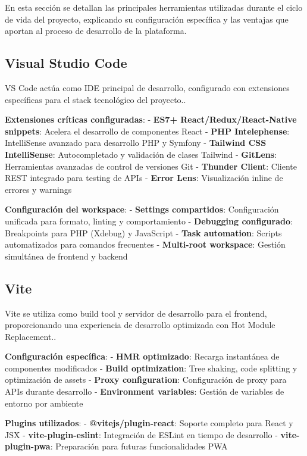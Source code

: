 \documentclass[12pt,a4paper,oneside]{report}
\begin{document}
En esta sección se detallan las principales herramientas utilizadas
durante el ciclo de vida del proyecto, explicando su configuración
específica y las ventajas que aportan al proceso de desarrollo de la
plataforma.

\subsection{Visual Studio Code}\label{visual-studio-code}

VS Code actúa como IDE principal de desarrollo, configurado con
extensiones específicas para el stack tecnológico del proyecto..

\textbf{Extensiones críticas configuradas}: - \textbf{ES7+
React/Redux/React-Native snippets}: Acelera el desarrollo de componentes
React - \textbf{PHP Intelephense}: IntelliSense avanzado para desarrollo
PHP y Symfony - \textbf{Tailwind CSS IntelliSense}: Autocompletado y
validación de clases Tailwind - \textbf{GitLens}: Herramientas avanzadas
de control de versiones Git - \textbf{Thunder Client}: Cliente REST
integrado para testing de APIs - \textbf{Error Lens}: Visualización
inline de errores y warnings

\textbf{Configuración del workspace}: - \textbf{Settings compartidos}:
Configuración unificada para formato, linting y comportamiento -
\textbf{Debugging configurado}: Breakpoints para PHP (Xdebug) y
JavaScript - \textbf{Task automation}: Scripts automatizados para
comandos frecuentes - \textbf{Multi-root workspace}: Gestión simultánea
de frontend y backend

\subsection{Vite}\label{vite}

Vite se utiliza como build tool y servidor de desarrollo para el
frontend, proporcionando una experiencia de desarrollo optimizada con
Hot Module Replacement..

\textbf{Configuración específica}: - \textbf{HMR optimizado}: Recarga
instantánea de componentes modificados - \textbf{Build optimization}:
Tree shaking, code splitting y optimización de assets - \textbf{Proxy
configuration}: Configuración de proxy para APIs durante desarrollo -
\textbf{Environment variables}: Gestión de variables de entorno por
ambiente

\textbf{Plugins utilizados}: - \textbf{@vitejs/plugin-react}: Soporte
completo para React y JSX - \textbf{vite-plugin-eslint}: Integración de
ESLint en tiempo de desarrollo - \textbf{vite-plugin-pwa}: Preparación
para futuras funcionalidades PWA
\end{document}
